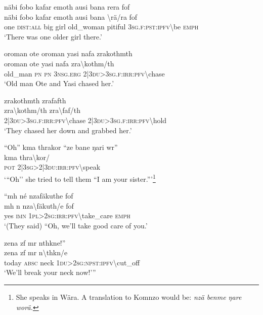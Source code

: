 \ea\label{ex:5:a1564}
näbi fobo kafar emoth ausi bana rera fof\\
\gll näbi	fobo	kafar	emoth	ausi	bana	{\textbackslash}rä/ra	fof\\
     one	\textsc{dist}:\textsc{all}	big	girl	old\_woman	pitiful	3\textsc{sg}.\textsc{f}:\textsc{pst}:\textsc{ipfv}{\textbackslash}be	\textsc{emph}\\
\glt `There was one older girl there.'
\z

\ea\label{ex:5:a1565}
oroman ote oroman yasi nafa zrakothmth\\
\gll oroman	ote	yasi	nafa	zra{\textbackslash}kothm/th\\
     old\_man	\textsc{pn}	\textsc{pn}	3\textsc{nsg}.\textsc{erg}	2|3\textsc{du}>3\textsc{sg}.\textsc{f}:\textsc{irr}:\textsc{pfv}{\textbackslash}chase\\
\glt `Old man Ote and Yasi chased her.'
\z

\newpage
\ea\label{ex:5:a1567}
zrakothmth zrafafth\\
\gll zra{\textbackslash}kothm/th	zra{\textbackslash}faf/th\\
     2|3\textsc{du}>3\textsc{sg}.\textsc{f}:\textsc{irr}:\textsc{pfv}{\textbackslash}chase	2|3\textsc{du}>3\textsc{sg}.\textsc{f}:\textsc{irr}:\textsc{pfv}{\textbackslash}hold\\
\glt `They chased her down and grabbed her.'
\z

\ea\label{ex:5:a1568}
``Oh'' kma thrakor ``ze bane ŋari wr''\\
\gll {\relax}   kma	thra{\textbackslash}kor/\\
     {\relax}   \textsc{pot}	2|3\textsc{sg}>2|3\textsc{du}:\textsc{irr}:\textsc{pfv}{\textbackslash}speak	{\relax}		{\relax}	\\
\glt `{``}Oh'' she tried to tell them ``I am your sister.'''\footnote{She speaks in Wära. A translation to Komnzo would be: \textit{nzä benme ŋare worä.}}
\z

\ea\label{ex:5:a5645}
``mh né nzafäkuthe fof\\
\gll mh	n	nza{\textbackslash}fäkuth/e	fof\\
     yes	\textsc{imn}	1\textsc{pl}>2\textsc{sg}:\textsc{irr}:\textsc{pfv}{\textbackslash}take\_care	\textsc{emph}\\
\glt `(They said) ``Oh, we'll take good care of you.'
\z

\ea\label{ex:5:a5646}
zena zf mr nthkne!''\\
\gll zena	zf	mr	n{\textbackslash}thkn/e\\
     today	\textsc{absc}	neck	1\textsc{du}>2\textsc{sg}:\textsc{npst}:\textsc{ipfv}{\textbackslash}cut\_off\\
\glt `We'll break your neck now!'''
\z

